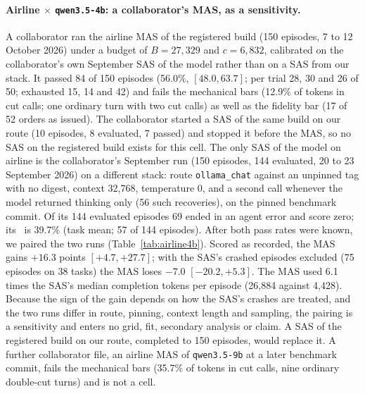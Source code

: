 \paragraph{Airline $\times$ \texttt{qwen3.5-4b}: a collaborator's MAS, as a sensitivity.} A collaborator ran the airline MAS of the registered build (150 episodes, 7 to 12 October 2026) under a budget of $B = 27{,}329$ and $c = 6{,}832$, calibrated on the collaborator's own September SAS of the model rather than on a SAS from our stack. It passed 84 of 150 episodes (56.0\%, $[48.0, 63.7]$; per trial 28, 30 and 26 of 50; exhausted 15, 14 and 42) and fails the mechanical bars (12.9\% of tokens in cut calls; one ordinary turn with two cut calls) as well as the fidelity bar (17 of 52 orders as issued). The collaborator started a SAS of the same build on our route (10 episodes, 8 evaluated, 7 passed) and stopped it before the MAS, so no SAS on the registered build exists for this cell. The only SAS of the model on airline is the collaborator's September run (150 episodes, 144 evaluated, 20 to 23 September 2026) on a different stack: route \texttt{ollama\_chat} against an unpinned tag with no digest, context 32,768, temperature 0, and a second call whenever the model returned thinking only (56 such recoveries), on the pinned benchmark commit. Of its 144 evaluated episodes 69 ended in an agent error and score zero; its \passone\ is 39.7\% (task mean; 57 of 144 episodes). After both pass rates were known, we paired the two runs (Table~\ref{tab:airline4b}). Scored as recorded, the MAS gains $+16.3$ points $[+4.7, +27.7]$; with the SAS's crashed episodes excluded (75 episodes on 38 tasks) the MAS loses $-7.0$ $[-20.2, +5.3]$. The MAS used 6.1 times the SAS's median completion tokens per episode (26,884 against 4,428). Because the sign of the gain depends on how the SAS's crashes are treated, and the two runs differ in route, pinning, context length and sampling, the pairing is a sensitivity and enters no grid, fit, secondary analysis or claim. A SAS of the registered build on our route, completed to 150 episodes, would replace it. A further collaborator file, an airline MAS of \texttt{qwen3.5-9b} at a later benchmark commit, fails the mechanical bars (35.7\% of tokens in cut calls, nine ordinary double-cut turns) and is not a cell.

